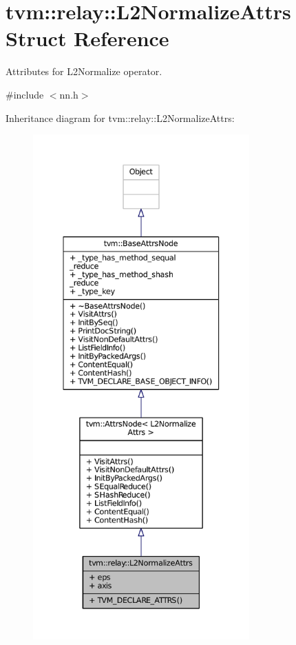 \hypertarget{structtvm_1_1relay_1_1L2NormalizeAttrs}{}\section{tvm\+:\+:relay\+:\+:L2\+Normalize\+Attrs Struct Reference}
\label{structtvm_1_1relay_1_1L2NormalizeAttrs}


Attributes for L2\+Normalize operator.  




{\ttfamily \#include $<$nn.\+h$>$}



Inheritance diagram for tvm\+:\+:relay\+:\+:L2\+Normalize\+Attrs\+:
\nopagebreak
\begin{figure}[H]
\begin{center}
\leavevmode
\includegraphics[height=550pt]{structtvm_1_1relay_1_1L2NormalizeAttrs__inherit__graph}
\end{center}
\end{figure}


